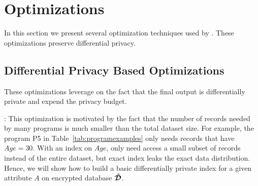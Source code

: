 \section{\system Optimizations}\label{sec:optimization}
In this section we present several optimization techniques used by \system. These optimizations preserve differential privacy.

\subsection{Differential Privacy Based Optimizations}\label{sec:dp_optimization}
These optimizations leverage on the fact that the final output is  differentially private and expend the privacy budget.

: This optimization is motivated by the fact that the number of records needed by many programs is much smaller than the total dataset size.  For example, the program  P5 in Table~\ref{tab:programexamples} only needs records that have $Age=30$. With an index on $Age$, \system only need access a small subset of records instead of the entire dataset, but exact index leaks the exact data distribution. Hence, we will show how to build a basic differentially private index for a given attribute $A$ on encrypted database $\boldsymbol{\tilde{\mathcal{D}}}$.


